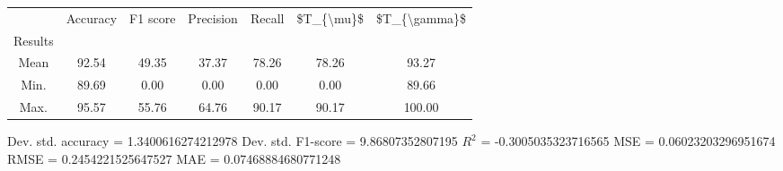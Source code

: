 \begin{tabular}{|c|c|c|c|c|c|c|}
\toprule
{} &  Accuracy &  F1 score &  Precision &  Recall &  \$T\_\{\textbackslash mu\}\$ &  \$T\_\{\textbackslash gamma\}\$ \\
Results &           &           &            &         &            &               \\
\hline
Mean    &     92.54 &     49.35 &      37.37 &   78.26 &      78.26 &         93.27 \\
Min.    &     89.69 &      0.00 &       0.00 &    0.00 &       0.00 &         89.66 \\
Max.    &     95.57 &     55.76 &      64.76 &   90.17 &      90.17 &        100.00 \\
\bottomrule
\end{tabular}

 Dev. std. accuracy = 1.3400616274212978
 Dev. std. F1-score = 9.86807352807195
 $R^2$ = -0.3005035323716565
 MSE = 0.06023203296951674
 RMSE = 0.2454221525647527
 MAE = 0.07468884680771248